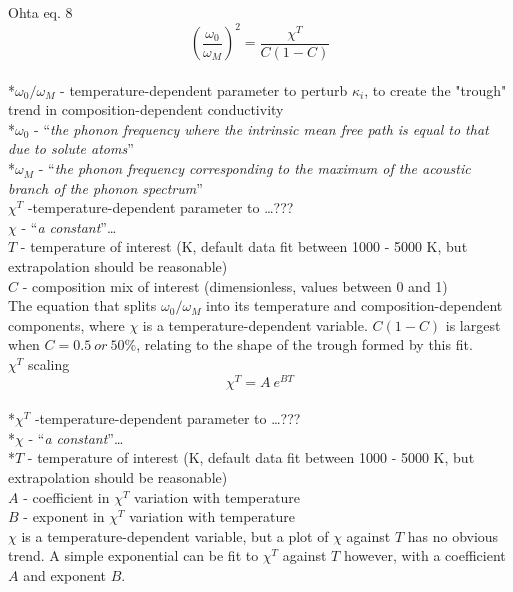 Ohta eq. 8 
\begin{equation}%
\left ( \frac{\omega_{0}}{\omega_{M}} \right )^{2}=\frac{\chi^{T}}{C\left ( 1-C \right )}  
\label{eq.ohta8}
\end{equation}%
\\ *$\omega_{0}/\omega_{M}$ - temperature-dependent parameter to perturb $\kappa_{i}$, to create the "trough" trend in composition-dependent conductivity\\
*$\omega_{0}$ - \enquote{\textit{the phonon frequency where the intrinsic mean free path is equal to that due to solute atoms}}\\
*$\omega_{M}$ - \enquote{\textit{the phonon frequency corresponding to the maximum of the acoustic branch of the phonon spectrum}}\\
$\chi^{T}$ -temperature-dependent parameter to \dots ??? \\
$\chi$ - \enquote{\textit{a constant}}\dots\\
$T$ - temperature of interest (K, default data fit between 1000 - 5000 K, but extrapolation should be reasonable)\\                    
$C$ - composition mix of interest (dimensionless, values between 0 and 1)\\

The equation that splits $\omega_{0}/\omega_{M}$ into its temperature and composition-dependent components, where $\chi$ is a temperature-dependent variable. $C\left ( 1-C \right )$ is largest when $C=0.5\ or\ 50\%$, relating to the shape of the trough formed by this fit.\\

$\chi^{T}$ scaling 
\begin{equation}%
\chi^{T}=A\ e^{BT}
\label{eq.chi_scale}
\end{equation}%
\\ *$\chi^{T}$ -temperature-dependent parameter to \dots ??? \\
*$\chi$ - \enquote{\textit{a constant}}\dots\\
*$T$ - temperature of interest (K, default data fit between 1000 - 5000 K, but extrapolation should be reasonable)\\                    
$A$ - coefficient in $\chi^{T}$ variation with temperature\\
$B$ - exponent in $\chi^{T}$ variation with temperature\\

$\chi$ is a temperature-dependent variable, but a plot of $\chi$ against $T$ has no obvious trend. A simple exponential can be fit to $\chi^{T}$ against $T$ however, with a coefficient $A$ and exponent $B$.\\

